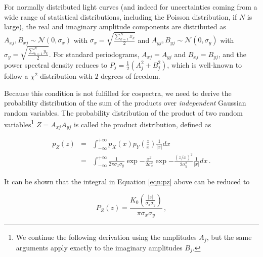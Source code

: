 \documentclass[12pt]{emulateapj}
\begin{document}
\noindent For normally distributed light curves (and indeed for uncertainties coming from a wide range of statistical distributions, including the Poisson distribution, if $N$ is large), the real and imaginary amplitude components are distributed as $A_{xj}, B_{xj} \sim \mathcal{N}(0, \sigma_x)$ with $\sigma_x =  \sqrt{\frac{\sum_{k=1}^{N}{x_k}}{2}}$ and  $A_{yj}, B_{yj} \sim \mathcal{N}(0, \sigma_y)$ with $\sigma_y = \sqrt{\frac{\sum_{k=1}^{N}{y_k}}{2}}$. 
For standard periodograms, $A_{xj} = A_{yj}$ and $B_{xj} = B_{yj}$, and the power spectral density reduces to $P_j = \frac{1}{2} (A_j^2 + B_j^2)$, which is well-known to follow a $\chi^2$ distribution with $2$ degrees of freedom. 

Because this condition is not fulfilled for cospectra, we need to derive the probability distribution of the sum of the products over \textit{independent} Gaussian random variables. The probability distribution of the product of two random variables\footnote{We continue the following derivation using the amplitudes $A_j$, but the same arguments apply exactly to the imaginary amplitudes $B_j$.} $Z = A_{xj}A_{yj}$ is called the product distribution, defined as 

\begin{eqnarray}
p_Z(z) & = & \int_{-\infty}^{+\infty}{p_X(x) p_Y(\frac{z}{x}) \frac{1}{|x|} dx} \\\nonumber
	   & = &  \int_{-\infty}^{+\infty}{\frac{1}{2 \pi \sigma_x \sigma_y} \exp{-\frac{x^2}{2\sigma_x^2}} \exp{-\frac{(z/x)^2}{2\sigma_y^2}} \frac{1}{|x|} dx} \label{eqn:pz} \, .
\end{eqnarray}

\noindent It can be shown \citep{watson1922,wishart1932} that the integral in Equation \ref{eqn:pz} above can be reduced to

\begin{equation}
\label{eqn:bessel}
P_Z(z) = \frac{K_0\left( \frac{|z|}{\sigma_x \sigma_y}\right)}{\pi \sigma_x \sigma_y} \, ,
\end{equation}
\end{document}
